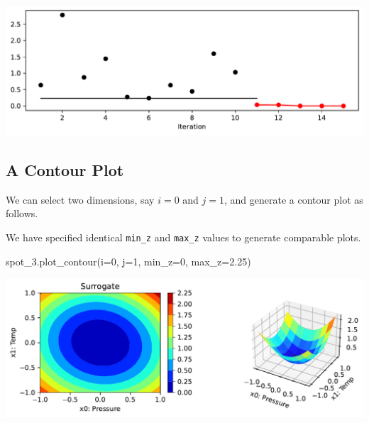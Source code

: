 \documentclass[
  letterpaper,
  DIV=11,
  numbers=noendperiod]{scrreprt}
\newenvironment{Shaded}{\begin{snugshade}}{\end{snugshade}}
\newcommand{\DecValTok}[1]{\textcolor[rgb]{0.68,0.00,0.00}{#1}}
\newcommand{\FloatTok}[1]{\textcolor[rgb]{0.68,0.00,0.00}{#1}}
\newcommand{\NormalTok}[1]{\textcolor[rgb]{0.00,0.23,0.31}{#1}}
\newcommand{\OperatorTok}[1]{\textcolor[rgb]{0.37,0.37,0.37}{#1}}
\begin{document}
\includegraphics{008_num_spot_multidim_files/figure-pdf/cell-6-output-1.pdf}

\subsection{A Contour Plot}\label{a-contour-plot}

We can select two dimensions, say \(i=0\) and \(j=1\), and generate a
contour plot as follows.

\begin{tcolorbox}[enhanced jigsaw, left=2mm, opacitybacktitle=0.6, leftrule=.75mm, toptitle=1mm, opacityback=0, colback=white, rightrule=.15mm, colframe=quarto-callout-note-color-frame, title=\textcolor{quarto-callout-note-color}{\faInfo}\hspace{0.5em}{Note:}, toprule=.15mm, coltitle=black, bottomrule=.15mm, bottomtitle=1mm, colbacktitle=quarto-callout-note-color!10!white, titlerule=0mm, breakable, arc=.35mm]

We have specified identical \texttt{min\_z} and \texttt{max\_z} values
to generate comparable plots.

\end{tcolorbox}

\begin{Shaded}
\begin{Highlighting}[]
\NormalTok{spot\_3.plot\_contour(i}\OperatorTok{=}\DecValTok{0}\NormalTok{, j}\OperatorTok{=}\DecValTok{1}\NormalTok{, min\_z}\OperatorTok{=}\DecValTok{0}\NormalTok{, max\_z}\OperatorTok{=}\FloatTok{2.25}\NormalTok{)}
\end{Highlighting}
\end{Shaded}

\includegraphics{008_num_spot_multidim_files/figure-pdf/cell-7-output-1.pdf}
\end{document}
